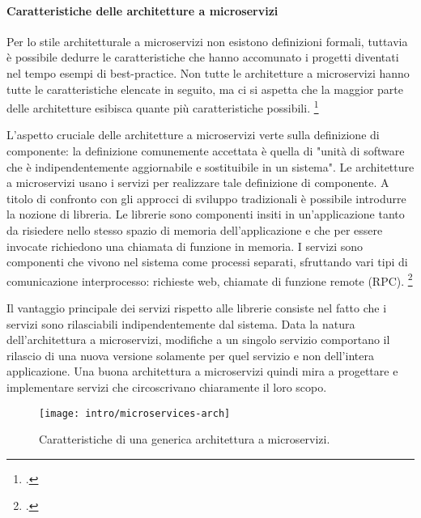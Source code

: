 \paragraph{Caratteristiche delle architetture a microservizi}
\label{par:microservizi-intro}

Per lo stile architetturale a microservizi non esistono definizioni formali, tuttavia è possibile dedurre le caratteristiche che hanno accomunato i progetti diventati nel tempo esempi di best-practice.
Non tutte le architetture a microservizi hanno tutte le caratteristiche elencate in seguito, ma ci si aspetta che la maggior parte delle architetture esibisca quante più caratteristiche possibili.
\footcite{site:fowler-microservices}

L'aspetto cruciale delle architetture a microservizi verte sulla definizione di componente: la definizione comunemente accettata è quella di "unità di software che è indipendentemente aggiornabile e sostituibile in un sistema".
Le architetture a microservizi usano i servizi per realizzare tale definizione di componente. A titolo di confronto con gli approcci di sviluppo tradizionali è possibile introdurre la nozione di libreria.
Le librerie sono componenti insiti in un'applicazione tanto da risiedere nello stesso spazio di memoria dell'applicazione e che per essere invocate richiedono una chiamata di funzione in memoria.
I servizi sono componenti che vivono nel sistema come processi separati, sfruttando vari tipi di comunicazione interprocesso: richieste web, chiamate di funzione remote (RPC).
\footcite{site:fowler-microservices}

Il vantaggio principale dei servizi rispetto alle librerie consiste nel fatto che i servizi sono rilasciabili indipendentemente dal sistema.
Data la natura dell'architettura a microservizi, modifiche a un singolo servizio comportano il rilascio di una nuova versione solamente per quel servizio e non dell'intera applicazione.
Una buona architettura a microservizi quindi mira a progettare e implementare servizi che circoscrivano chiaramente il loro scopo.

\begin{figure}[H]
    \centering
    \texttt{[image: intro/microservices-arch]}
    \caption{Caratteristiche di una generica architettura a microservizi.\\ \cite{site:fowler-microservices}}
    \label{fig:microservices-arch}
\end{figure}

